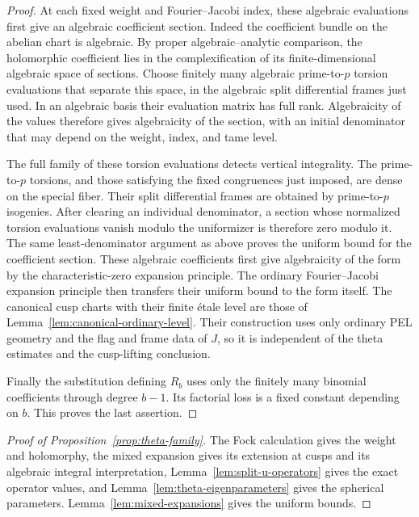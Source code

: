 \begin{proof}
 At each fixed weight and Fourier--Jacobi index, these algebraic
 evaluations first give an algebraic coefficient section.  Indeed the
 coefficient bundle on the abelian chart is algebraic.  By proper
 algebraic--analytic comparison, the holomorphic coefficient lies in
 the complexification of its finite-dimensional algebraic space of
 sections.  Choose finitely many algebraic
 prime-to-$p$ torsion evaluations that separate this space, in the
 algebraic split differential frames just used.  In an algebraic
 basis their evaluation matrix has full rank.  Algebraicity of the
 values therefore gives algebraicity of the section, with an initial
 denominator that may depend on the weight, index, and tame level.

 The full family of these torsion evaluations detects vertical integrality.
 The prime-to-$p$ torsions, and those
 satisfying the fixed congruences just imposed, are dense on the
 special fiber.  Their split differential frames are obtained by
 prime-to-$p$ isogenies.  After clearing an individual denominator, a
 section whose normalized torsion evaluations vanish modulo the
 uniformizer is therefore zero modulo it.  The same least-denominator
 argument as above proves the uniform bound for the coefficient
 section.  These algebraic coefficients first give algebraicity of the
 form by the characteristic-zero expansion principle.  The ordinary
 Fourier--Jacobi expansion principle then transfers their uniform
 bound to the form itself.
 The canonical cusp charts with their finite \'etale level are those
 of Lemma~\ref{lem:canonical-ordinary-level}.  Their construction uses
 only ordinary PEL geometry and the flag and frame data of $J$, so it
 is independent of the theta estimates and the cusp-lifting conclusion.

 Finally the substitution defining $R_b$ uses only the finitely many
 binomial coefficients through degree $b-1$.  Its factorial loss is a
 fixed constant depending on $b$.  This proves the last assertion.
\end{proof}

\begin{proof}[Proof of Proposition~\ref{prop:theta-family}]
 The Fock calculation gives the weight and holomorphy, the mixed
 expansion gives its extension at cusps and its algebraic integral
 interpretation, Lemma~\ref{lem:split-u-operators} gives the exact
 operator values, and Lemma~\ref{lem:theta-eigenparameters} gives the
 spherical parameters.  Lemma~\ref{lem:mixed-expansions} gives the
 uniform bounds.
\end{proof}
